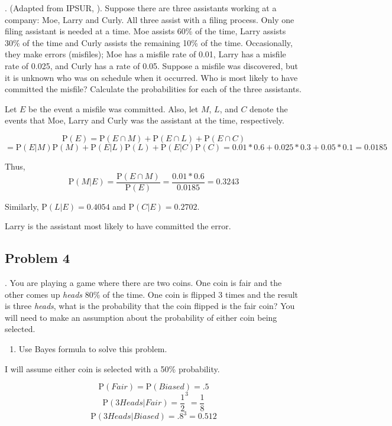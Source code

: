 \documentclass[
]{book}
\providecommand{\tightlist}{%
  \setlength{\itemsep}{0pt}\setlength{\parskip}{0pt}}
\begin{document}
. (Adapted from IPSUR, \citep{ipsur}). Suppose there are three assistants working at a company: Moe, Larry and Curly. All three assist with a filing process. Only one filing assistant is needed at a time. Moe assists 60\% of the time, Larry assists 30\% of the time and Curly assists the remaining 10\% of the time. Occasionally, they make errors (misfiles); Moe has a misfile rate of 0.01, Larry has a misfile rate of 0.025, and Curly has a rate of 0.05. Suppose a misfile was discovered, but it is unknown who was on schedule when it occurred. Who is most likely to have committed the misfile? Calculate the probabilities for each of the three assistants.

Let \(E\) be the event a misfile was committed. Also, let \(M\), \(L\), and \(C\) denote the events that Moe, Larry and Curly was the assistant at the time, respectively.

\[
\mbox{P}(E)=\mbox{P}(E \cap M)+\mbox{P}(E \cap L)+\mbox{P}(E\cap C) 
\]
\[
= \mbox{P}(E|M)\mbox{P}(M)+\mbox{P}(E|L)\mbox{P}(L)+\mbox{P}(E|C)\mbox{P}(C) = 0.01*0.6+0.025*0.3+0.05*0.1 = 0.0185
\]

Thus,
\[
\mbox{P}(M|E)=\frac{\mbox{P}(E \cap M)}{\mbox{P}(E)}= \frac{0.01*0.6}{0.0185}=0.3243
\]

Similarly, \(\mbox{P}(L|E)=0.4054\) and \(\mbox{P}(C|E)=0.2702\).

Larry is the assistant most likely to have committed the error.

\hypertarget{problem-4-2}{%
\subsection{Problem 4}\label{problem-4-2}}

. You are playing a game where there are two coins. One coin is fair and the other comes up \emph{heads} 80\% of the time. One coin is flipped 3 times and the result is three \emph{heads}, what is the probability that the coin flipped is the fair coin? You will need to make an assumption about the probability of either coin being selected.

\begin{enumerate}
\def\labelenumi{\alph{enumi}.}
\tightlist
\item
  Use Bayes formula to solve this problem.
\end{enumerate}

I will assume either coin is selected with a 50\% probability.

\[
\mbox{P}(Fair) = \mbox{P}(Biased) = .5
\]
\[
\mbox{P}(3 Heads|Fair)=\frac{1}{2}^3=\frac{1}{8}
\]
\[
\mbox{P}(3 Heads|Biased)=.8^3=0.512
\]
\end{document}
